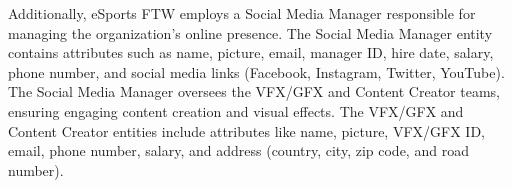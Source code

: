 Additionally, eSports FTW employs a Social Media Manager responsible for managing the organization's online presence. The Social Media Manager entity contains attributes such as name, picture, email, manager ID, hire date, salary, phone number, and social media links (Facebook, Instagram, Twitter, YouTube). The Social Media Manager oversees the VFX/GFX and Content Creator teams, ensuring engaging content creation and visual effects. The VFX/GFX and Content Creator entities include attributes like name, picture, VFX/GFX ID, email, phone number, salary, and address (country, city, zip code, and road number).
